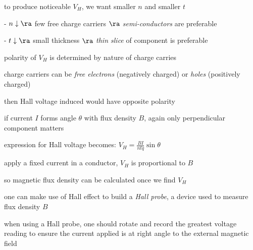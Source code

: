 \cmt to produce noticeable $V_H$, we want smaller $n$ and smaller $t$

\begin{compactenum}
	\item[-] $n\downarrow \ra$ few free charge carriers $\ra$ \emph{semi-conductors} are preferable

	\item[-] $t\downarrow \ra$ small thickness $\ra$ \emph{thin slice} of component is preferable

\end{compactenum}

\cmt polarity of $V_H$ is determined by nature of charge carries
	
charge carriers can be \emph{free electrons} (negatively charged) or \emph{holes} (positively charged)
	
then Hall voltage induced would have opposite polarity

\cmt if current $I$ forms angle $\theta$ with flux density $B$, again only perpendicular component matters

expression for Hall voltage becomes: $V_H = \frac{BI}{ntq}\sin\theta$
	
\cmt apply a fixed current in a conductor, $V_H$ is proportional to $B$
	
so magnetic flux density can be calculated once we find $V_H$
	
one can make use of Hall effect to build a \emph{Hall probe}, a device used to measure flux density $B$

when using a Hall probe, one should rotate and record the greatest voltage reading to ensure the current applied is at right angle to the external magnetic field


	
